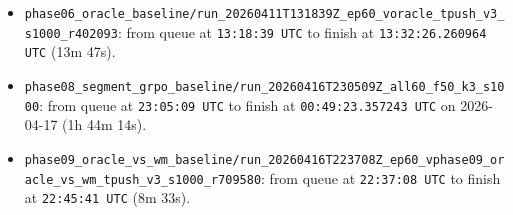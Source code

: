 \documentclass{article}
\begin{document}

% 








\begin{itemize}
  \item \texttt{phase06\_oracle\_baseline/run\_20260411T131839Z\_ep60\_voracle\_tpush\_v3\_s1000\_r402093}: 
    from queue at \texttt{13:18:39 UTC} to finish at \texttt{13:32:26.260964 UTC} (13m 47s).
  \item \texttt{phase08\_segment\_grpo\_baseline/run\_20260416T230509Z\_all60\_f50\_k3\_s1000}: 
    from queue at \texttt{23:05:09 UTC} to finish at \texttt{00:49:23.357243 UTC} on 2026-04-17 (1h 44m 14s).
  \item \texttt{phase09\_oracle\_vs\_wm\_baseline/run\_20260416T223708Z\_ep60\_vphase09\_oracle\_vs\_wm\_tpush\_v3\_s1000\_r709580}: 
    from queue at \texttt{22:37:08 UTC} to finish at \texttt{22:45:41 UTC} (8m 33s).
\end{itemize}
\end{document}
